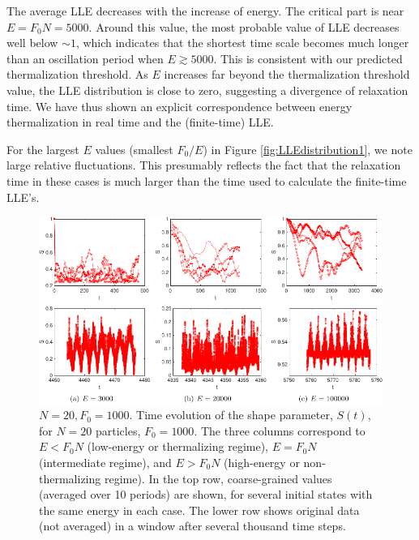 \documentclass[a4paper, onecolumn]{revtex4-1}
\begin{document}
The average LLE decreases with the increase of energy. The critical part is near $E = F_0N = 5000$.
Around this value, the most probable value of LLE decreases well below $\sim1$, which indicates that
the shortest time scale becomes much longer than an oscillation period when $E\gtrsim5000$.  This is
consistent with our predicted thermalization threshold.  As $E$ increases far beyond the
thermalization threshold value, the LLE distribution is close to zero, suggesting a divergence of
relaxation time.
%
We have thus shown an explicit correspondence between energy thermalization in real time and the
(finite-time) LLE.

For the largest $E$ values (smallest $F_0/E$) in Figure \ref{fig:LLEdistribution1}, we note large
relative fluctuations.  This presumably reflects the fact that the relaxation time in these cases is
much larger than the time used to calculate the finite-time LLE's.



\begin{figure}[tb]
\includegraphics[width=\textwidth]{combine_shapedynamics_a_01-crop.pdf}
\caption{$N=20, F_0=1000$. Time evolution of the shape parameter, $S(t)$, for $N=20$ particles,
  $F_0=1000$.  The three columns correspond to $E<F_0N$ (low-energy or thermalizing regime),
  $E=F_0N$ (intermediate regime), and $E>F_0N$ (high-energy or non-thermalizing regime).  In the top
  row, coarse-grained values (averaged over 10 periods) are shown, for several initial states with
  the same energy in each case.  The lower row shows original data (not averaged) in a window after
  several thousand time steps.  }
\label{fig:time_evolution_of_S}
\end{figure}
\end{document}
